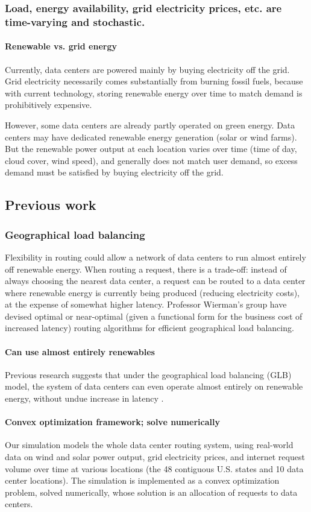 \documentclass{acm_proc_article-sp}
\begin{document}
	\subsubsection{Load, energy availability, grid electricity prices, etc. are time-varying and stochastic.}
		\paragraph{Renewable vs. grid energy}
			Currently, data centers are powered mainly by buying electricity off the grid. Grid electricity necessarily comes substantially from burning fossil fuels, because with current technology, storing renewable energy over time to match demand is prohibitively expensive.
			
			However, some data centers are already partly operated on green energy. Data centers may have dedicated renewable energy generation (solar or wind farms). But the renewable power output at each location varies over time (time of day, cloud cover, wind speed), and generally does not match user demand, so excess demand must be satisfied by buying electricity off the grid.


\subsection{Previous work}
	\subsubsection{Geographical load balancing}
		Flexibility in routing could allow a network of data centers to run almost entirely off renewable energy. When routing a request, there is a trade-off: instead of always choosing the nearest data center, a request can be routed to a data center where renewable energy is currently being produced (reducing electricity costs), at the expense of somewhat higher latency. Professor Wierman’s group have devised optimal or near-optimal (given a functional form for the business cost of increased latency) routing algorithms for efficient geographical load balancing.
		\paragraph{Can use almost entirely renewables}
			Previous research suggests that under the geographical load balancing (GLB) model, the system of data centers can even operate almost entirely on renewable energy, without undue increase in latency \cite{adam:GLB}.
		\paragraph{Convex optimization framework; solve numerically}
			Our simulation models the whole data center routing system, using real-world data on wind and solar power output, grid electricity prices, and internet request volume over time at various locations (the 48 contiguous U.S. states and 10 data center locations). The simulation is implemented as a convex optimization problem, solved numerically, whose solution is an allocation of requests to data centers.
\end{document}
